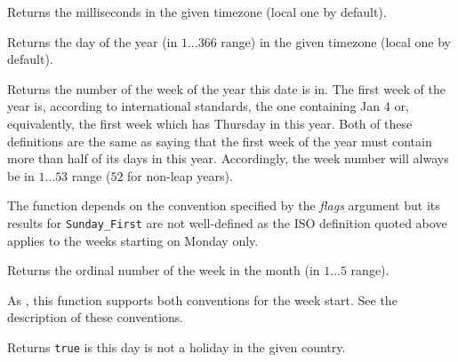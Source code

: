 
Returns the milliseconds in the given timezone (local one by default).


\label{wxdatetimegetdayofyear}


Returns the day of the year (in $1\ldots366$ range) in the given timezone
(local one by default).


\label{wxdatetimegetweekofyear}


Returns the number of the week of the year this date is in. The first week of
the year is, according to international standards, the one containing Jan 4 or,
equivalently, the first week which has Thursday in this year. Both of these
definitions are the same as saying that the first week of the year must contain
more than half of its days in this year. Accordingly, the week number will
always be in $1\ldots53$ range ($52$ for non-leap years).

The function depends on the  convention
specified by the {\it flags} argument but its results for
\texttt{Sunday\_First} are not well-defined as the ISO definition quoted above
applies to the weeks starting on Monday only.


\label{wxdatetimegetweekofmonth}


Returns the ordinal number of the week in the month (in $1\ldots5$  range).

As , this function supports
both conventions for the week start. See the description of these
 conventions.


\label{wxdatetimeisworkday}


Returns {\tt true} is this day is not a holiday in the given country.



